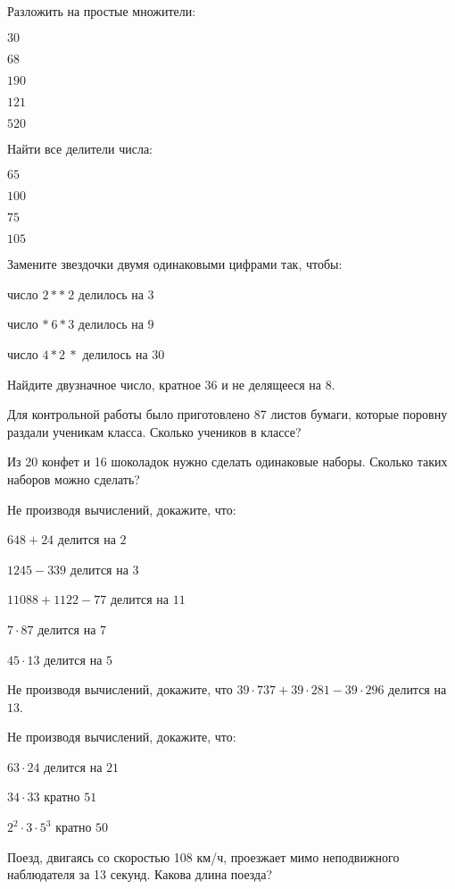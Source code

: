 \begin{listofex}
	\item Разложить на простые множители:
	\begin{enumcols}[itemcolumns=5]
		\item \( 30 \)
		\item \( 68 \)
		\item \( 190 \)
		\item \( 121 \)
		\item \( 520 \)
	\end{enumcols}
	\item Найти все делители числа:
	\begin{enumcols}[itemcolumns=4]
		\item \( 65 \)
		\item \( 100 \)
		\item \( 75 \)
		\item \( 105 \)
	\end{enumcols}
	\item Замените звездочки двумя одинаковыми цифрами так, чтобы:
	\begin{enumcols}[itemcolumns=1]
		\item число \( 2**\:2 \) делилось на \( 3 \)
		\item число \( *\:6*3 \) делилось на \( 9 \)
		\item число \( 4*2\:* \) делилось на \( 30 \)
	\end{enumcols}
	\item Найдите двузначное число, кратное 36 и не делящееся на 8.
	\item Для контрольной работы было приготовлено 87 листов бумаги, которые поровну раздали ученикам класса. Сколько учеников в классе?
	\item Из 20 конфет и 16 шоколадок нужно сделать одинаковые наборы. Сколько таких наборов можно сделать?
	\item Не производя вычислений, докажите, что:
	\begin{enumcols}[itemcolumns=2]
		\item \( 648+24 \) делится на \( 2 \)
		\item \( 1245-339 \) делится на \( 3 \)
		\item \( 11088+1122-77 \) делится на \( 11 \)
		\item \( 7\cdot87 \) делится на \( 7 \)
		\item \( 45\cdot13 \) делится на \( 5 \)
	\end{enumcols}
	\item Не производя вычислений, докажите, что \( 39\cdot737+39\cdot281-39\cdot296 \) делится на \( 13 \).
	\item Не производя вычислений, докажите, что:
	\begin{enumcols}[itemcolumns=2]
		\item \( 63\cdot24 \) делится на \( 21 \)
		\item \( 34\cdot33 \) кратно \( 51 \)
		\item \( 2^2\cdot3\cdot5^3 \) кратно \( 50 \)
	\end{enumcols}
	\item Поезд, двигаясь со скоростью 108 км/ч, проезжает мимо неподвижного наблюдателя за 13 секунд. Какова длина поезда?
\end{listofex}
